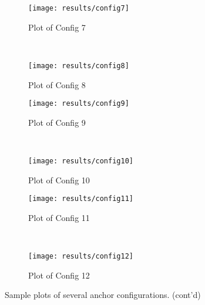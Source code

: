     \begin{figure}\ContinuedFloat
        \begin{subfigure}[b]{0.49\textwidth}
            \texttt{[image: results/config7]}
            \caption{Plot of Config 7}
        \end{subfigure}
        ~ %
        \begin{subfigure}[b]{0.49\textwidth}
            \texttt{[image: results/config8]}
            \caption{Plot of Config 8}
        \end{subfigure}

        \begin{subfigure}[b]{0.49\textwidth}
            \texttt{[image: results/config9]}
            \caption{Plot of Config 9}
        \end{subfigure}
        ~ %
        \begin{subfigure}[b]{0.49\textwidth}
            \texttt{[image: results/config10]}
            \caption{Plot of Config 10}
        \end{subfigure}

        \begin{subfigure}[b]{0.49\textwidth}
            \texttt{[image: results/config11]}
            \caption{Plot of Config 11}
        \end{subfigure}
        ~ %
        \begin{subfigure}[b]{0.49\textwidth}
            \texttt{[image: results/config12]}
            \caption{Plot of Config 12}
        \end{subfigure}
        \caption[]{Sample plots of several anchor configurations. (cont'd)}
    \end{figure}


